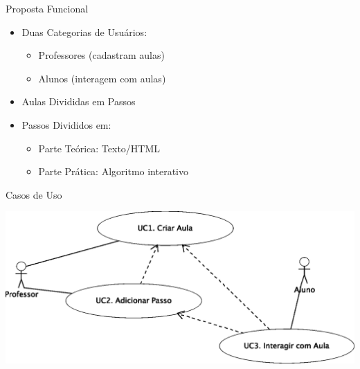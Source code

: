 \documentclass{beamer}
\begin{document}
\begin{frame}{Proposta Funcional}
	\begin{itemize}
	 	\item Duas Categorias de Usuários:
		\begin{itemize}
			\item Professores (cadastram aulas) 
			\item Alunos (interagem com aulas)
		\end{itemize}
		\item Aulas Divididas em Passos
		\item Passos Divididos em:
		\begin{itemize}
			\item Parte Teórica: Texto/HTML
			\item Parte Prática: Algoritmo interativo
		\end{itemize}
	\end{itemize}
\end{frame}

\begin{frame}{Casos de Uso}
	\begin{center}
		\includegraphics[scale=0.65]{../trabalho_full/casos.eps}
	\end{center}
\end{frame}
\end{document}

